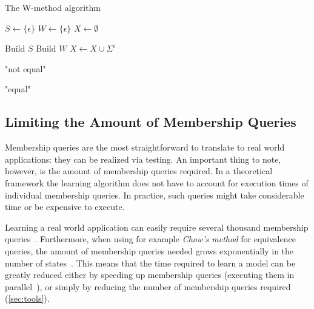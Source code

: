 \begin{algorithm}[h]
\caption{The W-method algorithm}
\label{alg:w-method}
\begin{algorithmic}[1]
 
\State $S \gets \{ \epsilon \}$ 
\State $W \gets \{ \epsilon \}$ 
\State $X \gets \emptyset$ 

\State Build $S$ 
\State Build $W$ 
 
\State $X \gets X \cup \Sigma^{i}$ 
\EndFor

\State \Return "not equal"
\EndIf
\State {} 
\EndFor
\EndFor
\EndFor

\State \Return "equal"

\EndFunction{}
\end{algorithmic}
\end{algorithm}

\subsection{Limiting the Amount of Membership Queries}
Membership queries are the most straightforward to translate to real world
applications: they can be realized via testing.  An important thing to note,
however, is the amount of membership queries required.  In a theoretical
framework the learning algorithm does not have to account for execution times of
individual membership queries. In practice, such queries might take
considerable time or be expensive to execute.

Learning a real world application can easily require several thousand membership
queries~\cite[p. 100]{Tomte2014}. Furthermore, when using for example
\textit{Chow's method} for equivalence queries, the amount of membership queries
needed grows exponentially in the number of states~\cite{Chow1978}.  This means
that the time required to learn a model can be greatly reduced either by
speeding up membership queries (executing them in parallel~\cite{Howar2012}), or
simply by reducing the number of membership queries required (\cref{sec:tools}).

